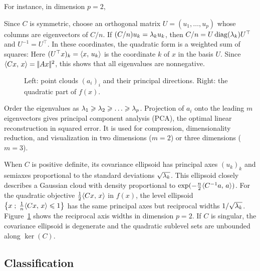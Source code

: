 For instance, in dimension $p=2$, 

Since $C$ is symmetric, choose an orthogonal matrix $U=(u_1,\ldots,u_p)$ whose columns are eigenvectors of $C/n$. If $(C/n)u_k=\lambda_k u_k$, then $C/n=U\operatorname{diag}(\lambda_k)U^\top$ and $U^{-1}=U^\top$. In these coordinates, the quadratic form is a weighted sum of squares:
Here $( U^\top x )_k = \langle x,\,u_k\rangle$ is the coordinate $k$ of $x$ in the basis $U$. Since $\langle Cx,\,x\rangle=|\!| Ax |\!|^2$, this shows that all eigenvalues are nonnegative.

\begin{figure}[tbp]
\centering
{}
\caption{Left: point clouds $(a_i)_i$ and their principal directions. Right: the quadratic part of $f(x)$.}
\label{fig-link-pca}
\end{figure}

Order the eigenvalues as $\lambda_1 \geqslant \lambda_2 \geqslant \ldots \geqslant \lambda_p$. Projection of $a_i$ onto the leading $m$ eigenvectors gives principal component analysis (PCA), the optimal linear reconstruction in squared error. It is used for compression, dimensionality reduction, and visualization in two dimensions ($m=2$) or three dimensions ($m=3$).

When $C$ is positive definite, its covariance ellipsoid has principal axes $(u_k)_k$ and semiaxes proportional to the standard deviations $\sqrt{\lambda_k}$.
%
This ellipsoid closely describes a Gaussian cloud with density proportional to $\exp(-\frac n2\langle C^{-1}a,\,a\rangle)$.
%
For the quadratic objective $\frac{1}{2}\langle Cx,\,x\rangle$ in $f(x)$, the level ellipsoid $\left\{ x \;;\; \frac{1}{n}\langle Cx,\,x\rangle \leqslant 1 \right\}$ has the same principal axes but reciprocal widths $1/\sqrt{\lambda_k}$.
%
Figure~\ref{fig-link-pca} shows the reciprocal axis widths in dimension $p=2$. If $C$ is singular, the covariance ellipsoid is degenerate and the quadratic sublevel sets are unbounded along $\ker(C)$.



\subsection{Classification}

